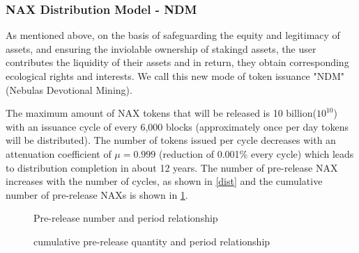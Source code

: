 \subsubsection{NAX Distribution Model - NDM}
As mentioned above, on the basis of safeguarding the equity and legitimacy of assets, and ensuring the inviolable ownership of stakingd assets, the user contributes the liquidity of their assets and in return, they obtain corresponding ecological rights and interests. We call this new mode of token issuance "NDM" (Nebulas Devotional Mining). 

The maximum amount of NAX tokens that will be released is 10 billion(\(10^{10}\)) with an issuance cycle of every 6,000 blocks (approximately once per day tokens will be distributed). The number of tokens issued per cycle decreases with an attenuation coefficient of $\mu=0.999$ (reduction of 0.001\% every cycle) which leads to distribution completion in about 12 years. The number of pre-release NAX increases with the number of cycles, as shown in \ref{dist} and the cumulative number of pre-release NAXs is shown in \ref{acc}.

\begin{figure}[h]
\centering
\begin{minipage}[5cm]{.45\textwidth}
\centering
\caption{Pre-release number and period relationship}\label{dist}

\vspace{\baselineskip}
\end{minipage}\qquad
\begin{minipage}[5cm]{.45\textwidth}
\centering
\caption{cumulative pre-release quantity and period relationship}\label{acc}
\end{minipage}
\end{figure}

